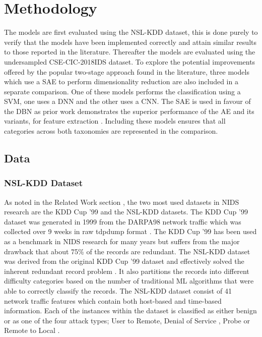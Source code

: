 \documentclass[conference]{IEEEtran}
\begin{document}
\section{Methodology}

The models are first evaluated using the NSL-KDD dataset, this is done purely to verify that the models have been implemented correctly and attain similar results to those reported in the literature. Thereafter the models are evaluated using the undersampled CSE-CIC-2018IDS dataset. To explore the potential improvements offered by the popular two-stage approach found in the literature, three models which use a SAE to perform dimensionality reduction are also included in a separate comparison. One of these models performs the classification using a SVM, one uses a DNN and the other uses a CNN. The SAE is used in favour of the DBN as prior work demonstrates the superior performance of the AE and its variants, for feature extraction \cite{b10,b13,b14}. Including these  models ensures that all categories across both taxonomies are represented in the comparison.  \\


\subsection{Data}\label{AA}

\subsubsection{NSL-KDD Dataset}
As noted in the Related Work section , the two most used datasets in NIDS research are the KDD Cup ’99 and the NSL-KDD datasets. The KDD Cup ’99 dataset was generated in 1999 from the DARPA98 network traffic which was collected over 9 weeks in raw tdpdump format \cite{b2}. The KDD Cup ’99 has been used as a benchmark in NIDS research for many years but suffers from the major drawback that about 75\% of the records are redundant. The NSL-KDD dataset was derived from the original KDD Cup ’99 dataset and effectively solved the inherent redundant record problem \cite{b8}. It also partitions the records into different difficulty categories based on the number of traditional ML algorithms that were able to correctly classify the records.
The NSL-KDD dataset consist of 41 network traffic features which contain both host-based and time-based information. Each of the instances within the dataset is classified as either benign or as one of the four attack types; User to Remote, Denial of Service , Probe or Remote to Local \cite{b12}.\\
\end{document}
